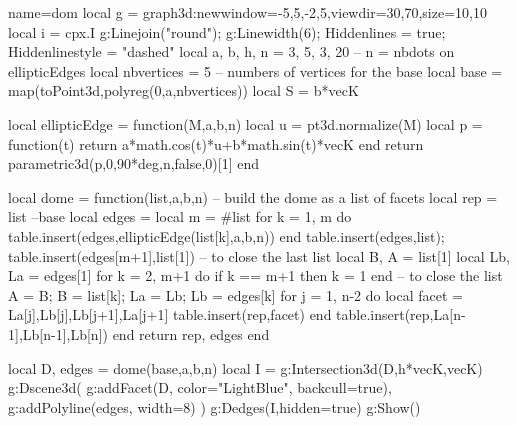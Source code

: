 \documentclass[12pt]{standalone}%
\begin{document}
\begin{luadraw}{name=dom}
local g = graph3d:new{window={-5,5,-2,5},viewdir={30,70},size={10,10}}
local i = cpx.I
g:Linejoin("round"); g:Linewidth(6); Hiddenlines = true; Hiddenlinestyle = "dashed"
local a, b, h, n = 3, 5, 3, 20 -- n = nbdots on ellipticEdges
local nbvertices = 5 -- numbers of vertices for the base
local base = map(toPoint3d,polyreg(0,a,nbvertices))
local S = b*vecK

local ellipticEdge = function(M,a,b,n)
    local u = pt3d.normalize(M)
    local p = function(t)
        return a*math.cos(t)*u+b*math.sin(t)*vecK
    end
    return parametric3d(p,0,90*deg,n,false,0)[1]
end

local dome = function(list,a,b,n) -- build the dome as a list of facets
    local rep = {list}  --base
    local edges = {}
    local m = #list
    for k = 1, m do
        table.insert(edges,ellipticEdge(list[k],a,b,n))
    end
    table.insert(edges,list); table.insert(edges[m+1],list[1]) -- to close the last list
    local B, A = list[1]
    local Lb, La = edges[1]
    for k = 2, m+1 do
        if k == m+1 then k = 1 end -- to close the list
        A = B; B = list[k]; La = Lb; Lb = edges[k]
        for j = 1, n-2 do
            local facet = {La[j],Lb[j],Lb[j+1],La[j+1]}
            table.insert(rep,facet)
        end
        table.insert(rep,{La[n-1],Lb[n-1],Lb[n]})
    end
    return rep, edges
end

local D, edges = dome(base,a,b,n)
local I = g:Intersection3d(D,{h*vecK,vecK})
g:Dscene3d(
    g:addFacet(D, {color="LightBlue", backcull=true}),
    g:addPolyline(edges, {width=8})
)
g:Dedges(I,{hidden=true})
g:Show()
\end{luadraw}
\end{document}
